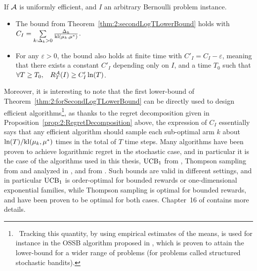 \begin{theorem}\label{thm:2:forSecondLogTLowerBound}
\begin{leftbarnospace}[theorembar]  %
    If $\mathcal{A}$ is uniformly efficient,
    and $I$ an arbitrary Bernoulli problem instance.
    \begin{itemize}
        \item
        The bound from Theorem~\ref{thm:2:secondLogTLowerBound} holds with
            $C_I = \sum\limits_{k: \Delta_k > 0} \frac{\Delta_k}{\mathrm{kl}(\mu_k, \mu^*)}$.
        \item
        For any $\varepsilon>0$, the bound also holds at finite time with
            $C'_I = C_I - \varepsilon$,
        meaning that there exists a constant $C'_I$ depending only on $I$,
        and a time $T_0$ such that $\forall T \geq T_0, \;\;\; R_T^{\mathcal{A}}(I) \geq C'_I \ln(T)$.
    \end{itemize}
\end{leftbarnospace}  %
\end{theorem}

Moreover, it is interesting to note that the first lower-bound of Theorem~\ref{thm:2:forSecondLogTLowerBound} can be directly used to design efficient algorithms\footnote{~Tracking this quantity, by using empirical estimates of the means, is used for instance in the OSSB algorithm proposed in \cite{Combes17}, which is proven to attain the lower-bound for a wider range of problems (for problems called structured stochastic bandits).}, as thanks to the regret decomposition given in Proposition~\ref{prop:2:RegretDecomposition} above, the expression of $C_I$ essentially says that any efficient algorithm
should sample each sub-optimal arm $k$ about $\ln(T)/\mathrm{kl}(\mu_k,\mu^*)$ times in the total of $T$ time steps.
%
Many algorithms have been proven to achieve logarithmic regret in the stochastic case,
and in particular it is the case of the algorithms used in this thesis, $\mathrm{UCB}_1$ from \cite{Auer02}, Thompson sampling from \cite{Thompson33} and analyzed in \cite{AgrawalGoyal11,Kaufmann12Thompson}, and \klUCB{} from \cite{Garivier11KL,KLUCBJournal}.
%
Such bounds are valid in different settings, and in particular $\mathrm{UCB}_1$ is order-optimal for bounded rewards or one-dimensional exponential families,
while Thompson sampling is optimal for bounded rewards, and \klUCB{} have been proven to be optimal for both cases.
%
Chapter~16 of \cite{LattimoreBanditAlgorithmsBook} contains more details.


